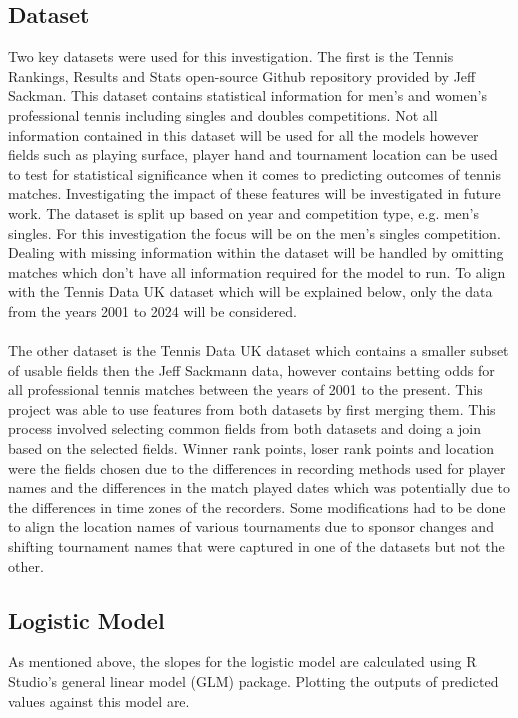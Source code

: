 \documentclass[12pt,a4paper]{article}
\begin{document}
\subsection{Dataset}
Two key datasets were used for this investigation. The first
is the Tennis Rankings, Results and Stats open-source
Github repository\cite{sackmann_jeffsackmanntennis_atp_2024} provided by Jeff Sackman.
This dataset contains
statistical information for men's and women's professional tennis including singles and
doubles competitions. Not all information contained in this dataset will be used for all
the models however fields such as playing surface, player hand and tournament location
can be used to test for statistical significance when it comes to predicting outcomes of
tennis matches. Investigating the impact of these features will be investigated in future
work. The dataset is split up based on year and competition type, e.g. men's
singles. For this investigation the focus will be on the men's singles competition.
Dealing with missing information within the dataset will be handled by omitting matches
which don't have all information required for the model to run. To align with the Tennis
Data UK dataset which will be explained below, only the data from the years 2001 to 2024
will be considered.
\\
\\
The other dataset is the Tennis Data UK \cite{tennis_data_uk} dataset which contains a
smaller subset of usable fields then the Jeff Sackmann data, however contains betting
odds for all professional tennis matches between the years of 2001 to the present. This
project was able to use features from both datasets by first merging them. This process
involved selecting common fields from both datasets and doing a join based on the selected
fields. Winner rank points, loser rank points and location were the fields chosen due to
the differences in recording methods used for player names and the differences in the match
played dates which was potentially due to the differences in time zones of the recorders.
Some modifications had to be done to align the location names of various tournaments due
to sponsor changes and shifting tournament names that were captured in one of the datasets
but not the other.

\subsection{Logistic Model}
As mentioned above, the slopes for the logistic model are
calculated using R Studio's general linear model (GLM) package. Plotting the
outputs of predicted values against this model are.
\end{document}
